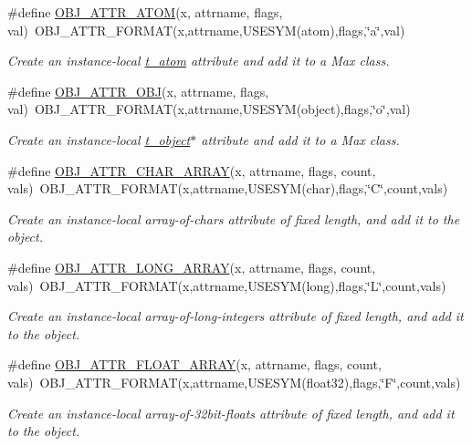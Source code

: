 \begin{DoxyCompactItemize}
\#define \hyperlink{group__attr_ga0db2095d20b842398b1f796c72e58dcb}{OBJ\_\-ATTR\_\-ATOM}(x, attrname, flags, val)~OBJ\_\-ATTR\_\-FORMAT(x,attrname,USESYM(atom),flags,\char`\"{}a\char`\"{},val)
\begin{DoxyCompactList}\small\item\em Create an instance-\/local \hyperlink{structt__atom}{t\_\-atom} attribute and add it to a Max class. \item\end{DoxyCompactList}\item 
\#define \hyperlink{group__attr_gaa0de4abe5962141bd267bffaa9421e95}{OBJ\_\-ATTR\_\-OBJ}(x, attrname, flags, val)~OBJ\_\-ATTR\_\-FORMAT(x,attrname,USESYM(object),flags,\char`\"{}o\char`\"{},val)
\begin{DoxyCompactList}\small\item\em Create an instance-\/local \hyperlink{structt__object}{t\_\-object}$\ast$ attribute and add it to a Max class. \item\end{DoxyCompactList}\item 
\#define \hyperlink{group__attr_ga46772e0865cd498f00c4a210daa673d1}{OBJ\_\-ATTR\_\-CHAR\_\-ARRAY}(x, attrname, flags, count, vals)~OBJ\_\-ATTR\_\-FORMAT(x,attrname,USESYM(char),flags,\char`\"{}C\char`\"{},count,vals)
\begin{DoxyCompactList}\small\item\em Create an instance-\/local array-\/of-\/chars attribute of fixed length, and add it to the object. \item\end{DoxyCompactList}\item 
\#define \hyperlink{group__attr_ga46a8ff560bbdc63a518d5f36f378c98e}{OBJ\_\-ATTR\_\-LONG\_\-ARRAY}(x, attrname, flags, count, vals)~OBJ\_\-ATTR\_\-FORMAT(x,attrname,USESYM(long),flags,\char`\"{}L\char`\"{},count,vals)
\begin{DoxyCompactList}\small\item\em Create an instance-\/local array-\/of-\/long-\/integers attribute of fixed length, and add it to the object. \item\end{DoxyCompactList}\item 
\#define \hyperlink{group__attr_gacc0e80be311a6716c6054da87fecd568}{OBJ\_\-ATTR\_\-FLOAT\_\-ARRAY}(x, attrname, flags, count, vals)~OBJ\_\-ATTR\_\-FORMAT(x,attrname,USESYM(float32),flags,\char`\"{}F\char`\"{},count,vals)
\begin{DoxyCompactList}\small\item\em Create an instance-\/local array-\/of-\/32bit-\/floats attribute of fixed length, and add it to the object. \item\end{DoxyCompactList}\item 

\end{DoxyCompactItemize}
